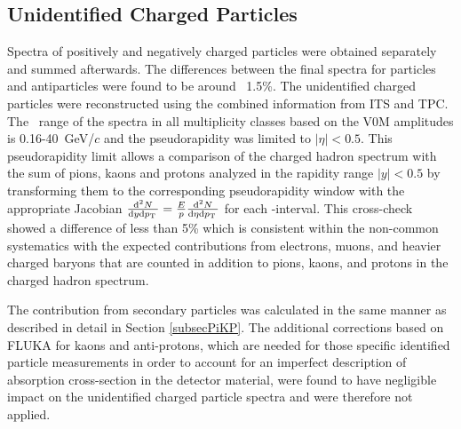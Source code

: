 \subsection{\label{subsecunidentified}Unidentified Charged Particles}



Spectra of positively and negatively charged particles were obtained separately and summed afterwards.
The differences between the final spectra for particles and antiparticles were found to be around ~1.5\%.
The unidentified charged particles were reconstructed using the combined information from ITS and TPC. The \pt~range of the spectra in all multiplicity classes based on the V0M amplitudes is 0.16-40\ GeV/$c$ and the pseudorapidity was limited to $|\eta| < 0.5$. 
This pseudorapidity limit allows a comparison of the charged hadron spectrum with the sum of pions, kaons and protons analyzed in the rapidity range $|y| < 0.5$ by transforming them to the corresponding pseudorapidity window with the appropriate Jacobian ${{\rm d}^2{N} \over {\rm d}y{\rm d}p_\mathrm T\,} = {E \over p} {{\rm d}^2{N} \over {\rm d}\eta{\rm d}p_\mathrm T\,}$ for each \pt-interval. This cross-check showed a difference of less than 5\% which is consistent within the non-common systematics with the expected contributions from electrons, muons, and heavier charged baryons that are counted in addition to pions, kaons, and protons in the charged hadron spectrum.

The contribution from secondary particles was calculated in the same manner as described in detail in Section \ref{subsecPiKP}. The additional corrections based on FLUKA \cite{Ferrari:2005zk,BOHLEN2014211} for kaons and anti-protons, which are needed for those specific identified particle measurements in order to account for an imperfect description of absorption cross-section in the detector material, were found to have negligible impact on the unidentified charged particle spectra and were therefore not applied. 

